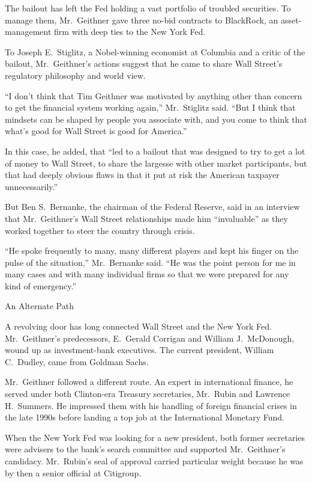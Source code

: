 \documentclass[12pt,a4paper,onecolumn]{article}
\begin{document}
The bailout has left the Fed holding a vast portfolio of troubled securities. To manage them,
Mr.~Geithner gave three no-bid contracts to BlackRock, an asset-management firm with deep ties to
the New York Fed.

To Joseph E.~Stiglitz, a Nobel-winning economist at Columbia and a critic of the bailout,
Mr.~Geithner's actions suggest that he came to share Wall Street's regulatory philosophy and world
view.

``I don't think that Tim Geithner was motivated by anything other than concern to get the financial
system working again,'' Mr.~Stiglitz said. ``But I think that mindsets can be shaped by people you
associate with, and you come to think that what's good for Wall Street is good for America.''

In this case, he added, that ``led to a bailout that was designed to try to get a lot of money to
Wall Street, to share the largesse with other market participants, but that had deeply obvious flaws
in that it put at risk the American taxpayer unnecessarily.''

But Ben S.~Bernanke, the chairman of the Federal Reserve, said in an interview that Mr.~Geithner's
Wall Street relationships made him ``invaluable'' as they worked together to steer the country
through crisis.

``He spoke frequently to many, many different players and kept his finger on the pulse of the
situation,'' Mr.~Bernanke said. ``He was the point person for me in many cases and with many
individual firms so that we were prepared for any kind of emergency.''

An Alternate Path

A revolving door has long connected Wall Street and the New York Fed. Mr.~Geithner's predecessors,
E.~Gerald Corrigan and William J.~McDonough, wound up as investment-bank executives. The current
president, William C.~Dudley, came from Goldman Sachs.

Mr.~Geithner followed a different route. An expert in international finance, he served under both
Clinton-era Treasury secretaries, Mr.~Rubin and Lawrence H.~Summers. He impressed them with his
handling of foreign financial crises in the late 1990s before landing a top job at the International
Monetary Fund.

When the New York Fed was looking for a new president, both former secretaries were advisers to the
bank's search committee and supported Mr.~Geithner's candidacy. Mr.~Rubin's seal of approval carried
particular weight because he was by then a senior official at Citigroup.
\end{document}
